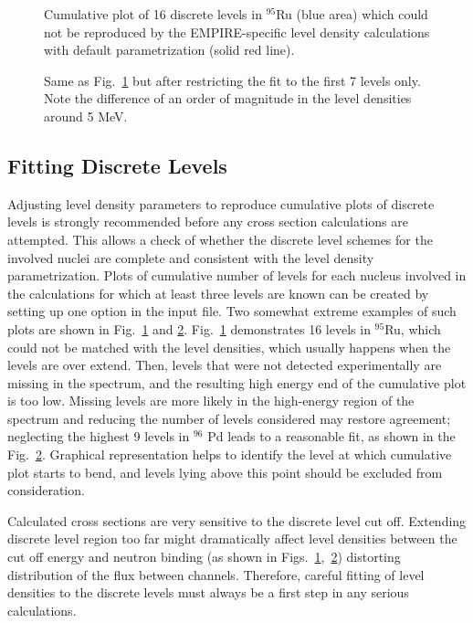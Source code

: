 \begin{figure}[tbp]
\caption{Cumulative plot of 16 discrete levels in $^{95}$Ru (blue area)
which could not be reproduced by the EMPIRE-specific level density
calculations with default parametrization (solid red line).}
\label{fig: badfit}
\end{figure}

\begin{figure}[tbp]
\caption{Same as Fig.~\protect\ref{fig: badfit} but after restricting the
fit to the first 7 levels only. Note the difference of an order of magnitude
in the level densities around 5 MeV.}
\label{fig: goodfit}
\end{figure}

\subsection{Fitting Discrete Levels}

Adjusting level density parameters to reproduce cumulative plots of discrete
levels is strongly recommended before any cross section calculations are
attempted. This allows a check of whether the discrete level schemes for the
involved nuclei are complete and consistent with the level density
parametrization. Plots of cumulative number of levels for each nucleus
involved in the calculations for which at least three levels are known can
be created by setting up one option in the input file. Two somewhat extreme
examples of such plots are shown in Fig.~\ref{fig: badfit} and \ref{fig: goodfit}. Fig.~\ref{fig: badfit} demonstrates 16 levels in $^{95}$Ru, which
could not be matched with the level densities, which usually happens when
the levels are over extend. Then, levels that were not detected
experimentally are missing in the spectrum, and the resulting high energy
end of the cumulative plot is too low. Missing levels are more likely in the
high-energy region of the spectrum and reducing the number of levels
considered may restore agreement; neglecting the highest 9 levels in $^{96}$%
Pd leads to a reasonable fit, as shown in the Fig.~\ref{fig: goodfit}.
Graphical representation helps to identify the level at which cumulative
plot starts to bend, and levels lying above this point should be excluded
from consideration.

Calculated cross sections are very sensitive to the discrete level cut off.
Extending discrete level region too far might dramatically affect level
densities between the cut off energy and neutron binding (as shown in Figs.~\ref{fig: badfit},~\ref{fig: goodfit}) distorting distribution of the flux between
channels. Therefore, careful fitting of level densities to the discrete
levels must always be a first step in any serious calculations.


